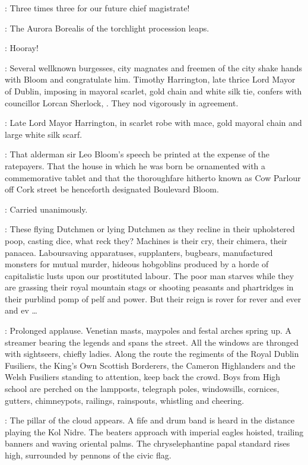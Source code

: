\Elector:
Three times three for our future chief magistrate!

:
The Aurora Borealis of the torchlight procession leaps.

\Torchbearers:
Hooray!

:
Several wellknown burgesses, city magnates and freemen of the city
shake hands with Bloom and congratulate him.
Timothy Harrington, late thrice Lord Mayor of Dublin,
imposing in mayoral scarlet, gold chain and white silk tie,
confers with councillor Lorcan Sherlock, .
They nod vigorously in agreement.

:
Late Lord Mayor Harrington, in scarlet robe with mace, 
gold mayoral chain and large white silk scarf.

\Harrington:
That alderman sir Leo Bloom's speech be printed at the expense of the ratepayers.
That the house in which he was born be ornamented with a commemorative tablet
and that the thoroughfare hitherto known as Cow Parlour off Cork street
be henceforth designated Boulevard Bloom.

\Lorcan[2]:
Carried unanimously.

\Bloom:
These flying Dutchmen or lying Dutchmen as they recline
in their upholstered poop, casting dice, what reck they?
Machines is their cry, their chimera, their panacea.
Laboursaving apparatuses, supplanters, bugbears,
manufactured monsters for mutual murder,
hideous hobgoblins produced by
a horde of capitalistic lusts upon our prostituted labour.
The poor man starves while they are grassing their royal mountain stags
or shooting peasants and phartridges in their purblind pomp of pelf and power.
But their reign is rover for rever and ever and ev \ldots

:
Prolonged applause.
Venetian masts, maypoles and festal arches spring up.
A streamer bearing the legends  and
 spans the street.
All the windows are thronged with sightseers, chiefly ladies.
Along the route the regiments of the Royal Dublin Fusiliers,
the King's Own Scottish Borderers, the Cameron Highlanders
and the Welsh Fusiliers standing to attention, keep back the crowd.
Boys from High school are perched on the lampposts, telegraph poles,
windowsills, cornices, gutters, chimneypots, railings, rainspouts,
whistling and cheering.

:
The pillar of the cloud appears.
A fife and drum band is heard in the distance playing the Kol Nidre.
The beaters approach with imperial eagles hoisted,
trailing banners and waving oriental palms.
The chryselephantine papal standard rises high,
surrounded by pennons of the civic flag.

